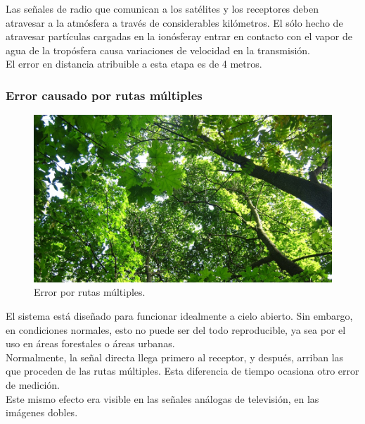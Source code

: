 Las señales de radio que comunican a los satélites y los receptores deben atravesar a la atmósfera a través de considerables kilómetros. El sólo hecho de atravesar partículas cargadas en la ionósfera\footnotemark y entrar en contacto con el vapor de agua de la tropósfera causa variaciones de velocidad en la transmisión. \\

El error en distancia atribuible a esta etapa es de 4 metros. 


\subsubsection{Error causado por rutas múltiples}

\begin{figure}[!ht]
\centering
\includegraphics{Figures/RutasMult}
\caption[Error por rutas múltiples.]{Error por rutas múltiples.}
\label{fig:ErrRMul}
\end{figure}

 El sistema está diseñado para funcionar idealmente a cielo abierto. Sin embargo, en condiciones normales, esto no puede ser del todo reproducible, ya sea por el uso en áreas forestales o áreas urbanas. \\
 
Normalmente, la señal directa llega primero al receptor, y después, arriban las que proceden de las rutas múltiples. Esta diferencia de tiempo ocasiona otro error de medición. \\

Este mismo efecto era visible en las señales análogas de televisión, en las imágenes dobles. \\


